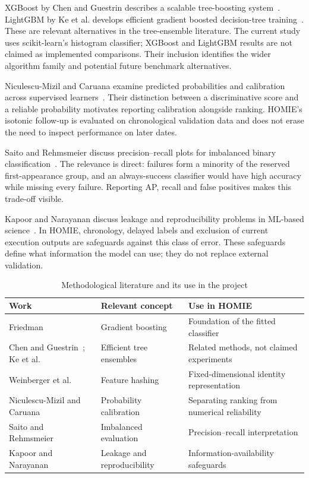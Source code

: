 \documentclass[12pt,a4paper,oneside]{report}
\begin{document}
XGBoost by Chen and Guestrin describes a scalable tree-boosting system~\cite{xgboost}. LightGBM by Ke et al. develops efficient gradient boosted decision-tree training~\cite{lightgbm}. These are relevant alternatives in the tree-ensemble literature. The current study uses scikit-learn's histogram classifier; XGBoost and LightGBM results are not claimed as implemented comparisons. Their inclusion identifies the wider algorithm family and potential future benchmark alternatives.

Niculescu-Mizil and Caruana examine predicted probabilities and calibration across supervised learners~\cite{niculescu}. Their distinction between a discriminative score and a reliable probability motivates reporting calibration alongside ranking. HOMIE's isotonic follow-up is evaluated on chronological validation data and does not erase the need to inspect performance on later dates.

Saito and Rehmsmeier discuss precision--recall plots for imbalanced binary classification~\cite{saito}. The relevance is direct: failures form a minority of the reserved first-appearance group, and an always-success classifier would have high accuracy while missing every failure. Reporting AP, recall and false positives makes this trade-off visible.

Kapoor and Narayanan discuss leakage and reproducibility problems in ML-based science~\cite{leakage}. In HOMIE, chronology, delayed labels and exclusion of current execution outputs are safeguards against this class of error. These safeguards define what information the model can use; they do not replace external validation.

\begin{table}[H]\centering\caption{Methodological literature and its use in the project}
\small\begin{tabularx}{\textwidth}{p{30mm}YY}\toprule Work&Relevant concept&Use in HOMIE\\\midrule
Friedman~\cite{friedman}&Gradient boosting&Foundation of the fitted classifier\\
Chen and Guestrin~\cite{xgboost}; Ke et al.~\cite{lightgbm}&Efficient tree ensembles&Related methods, not claimed experiments\\
Weinberger et al.~\cite{hashing}&Feature hashing&Fixed-dimensional identity representation\\
Niculescu-Mizil and Caruana~\cite{niculescu}&Probability calibration&Separating ranking from numerical reliability\\
Saito and Rehmsmeier~\cite{saito}&Imbalanced evaluation&Precision--recall interpretation\\
Kapoor and Narayanan~\cite{leakage}&Leakage and reproducibility&Information-availability safeguards\\\bottomrule\end{tabularx}\end{table}
\end{document}
